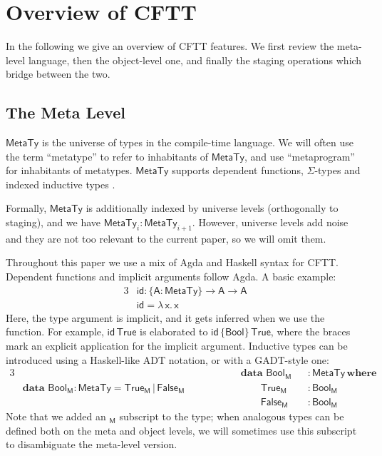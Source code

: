 \documentclass[acmsmall]{acmart}
\newcommand{\mit}[1]{{\mathsf{#1}}}
\newcommand{\msf}[1]{{\mathsf{#1}}}
\newcommand{\mbf}[1]{{\mathbf{#1}}}
\newcommand{\bs}[1]{\boldsymbol{#1}}
\newcommand{\ind}{\hspace{1em}}
\newcommand{\lam}{\lambda\,}
\newcommand{\data}{\mbf{data}\,}
\newcommand{\where}{\mbf{where}}
\newcommand{\M}{\msf{M}}
\newcommand{\vA}{\mathsf{A}}
\newcommand{\vx}{\mathsf{x}}
\newcommand{\Bool}{\msf{Bool}}
\newcommand{\MTy}{\msf{MetaTy}}
\newcommand{\True}{\msf{True}}
\newcommand{\False}{\msf{False}}
\theoremstyle{remark}
\newcommand{\id}{\mit{id}}
\begin{document}
\section{Overview of CFTT}\label{sec:overview-of-cftt}

In the following we give an overview of CFTT features. We first review the
meta-level language, then the object-level one, and finally the staging
operations which bridge between the two.

\subsection{The Meta Level}\label{sec:the-meta-level}

$\bs{\MTy}$ is the universe of types in the compile-time language. We will often
use the term ``metatype'' to refer to inhabitants of $\MTy$, and use
``metaprogram'' for inhabitants of metatypes. $\MTy$ supports dependent
functions, $\Sigma$-types and indexed inductive types \cite{inductivefamilies}.

Formally, $\MTy$ is additionally indexed by universe levels (orthogonally to
staging), and we have $\MTy_i : \MTy_{i+1}$. However, universe levels add noise
and they are not too relevant to the current paper, so we will omit them.

Throughout this paper we use a mix of Agda and Haskell syntax for
CFTT. Dependent functions and implicit arguments follow Agda. A basic example:
\begin{alignat*}{3}
  &\id : \{\vA : \MTy\} \to \vA \to \vA\\
  &\id = \lam \vx.\, \vx
\end{alignat*}
Here, the type argument is implicit, and it gets inferred when we use the
function. For example, $\id\,\True$ is elaborated to $\id\,\{\Bool\}\,\True$,
where the braces mark an explicit application for the implicit argument.
Inductive types can be introduced using a Haskell-like ADT notation, or with a
GADT-style one:
\begin{alignat*}{3}
  &                                           &&\hspace{4em}\data\,\Bool_\M &&: \MTy\,\where\\
  & \data\,\Bool_\M : \MTy = \True_\M\,|\,\False_\M &&\hspace{4em}\ind\ind \True_\M &&: \Bool_\M\\
  &                                           &&\hspace{4em}\ind\ind \False_\M &&: \Bool_\M
\end{alignat*}
Note that we added an $_\M$ subscript to the type; when analogous types can be
defined both on the meta and object levels, we will sometimes use this subscript
to disambiguate the meta-level version.
\end{document}
